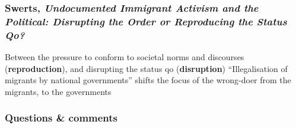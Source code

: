 \documentclass{article}
\begin{document}
\subsubsection{Swerts, \textit{Undocumented Immigrant Activism and the Political: Disrupting the Order or Reproducing the Status Qo?}}

\begin{outline}
	\1 Between the pressure to conform to societal norms and discourses (\textbf{reproduction}), and disrupting the status qo (\textbf{disruption})
	\1 ``Illegalisation of migrants by national governments'' shifts the focus of the wrong-doer from the migrants, to the governments 
\end{outline}

\subsubsection{Questions \& comments}
\end{document}
